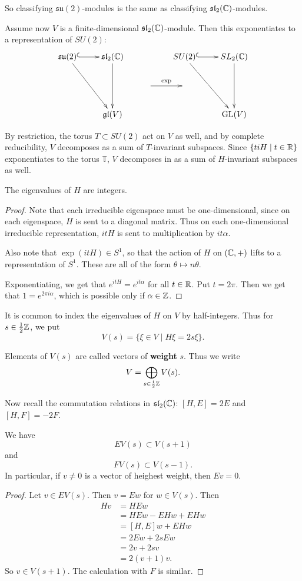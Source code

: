 \documentclass[11pt, english]{article}
\begin{document}
So classifying $\mathfrak{su}(2)$-modules is the same as classifying $\mathfrak{sl}_2(\mathbb{C})$-modules.

Assume now $V$ is a finite-dimensional $\mathfrak{sl}_2(\mathbb{C})$-module. Then this exponentiates to a representation of $SU(2)$:
$$
\xymatrix{
\mathfrak{su}(2) \ar@{^{(}->}[r] \ar[ddr] &  \mathfrak{sl}_2(\C) \ar[dd] & & SU(2) \ar[ddr]  \ar@{^(->}[r] & SL_2(\C) \ar[dd] \\
& & \ar[r]^{\exp}   & \\
&  \mathfrak{gl}(V) && & \GL(V)
}
$$

By restriction, the torus $T \subset SU(2)$ act on $V$ as well, and by complete reducibility, $V$ decomposes as a sum of $T$-invariant subspaces. Since $\{ ti H \mid t \in \mathbb{R} \}$ exponentiates to the torus $\mathbb T$, $V$ decomposes in as a sum of $H$-invariant subspaces as well.

\begin{lemma}
  The eigenvalues of $H$ are integers.
\end{lemma}
\begin{proof}
Note that each irreducible eigenspace must be one-dimensional, since on each eigenspace, $H$ is sent to a diagonal matrix. Thus on each one-dimensional irreducible representation, $itH$ is sent to multiplication by $it\alpha$.

Also note that $\exp(itH) \in S^1$, so that the action of $H$ on $(\mathbb{C},+)$ lifts to a representation of $S^1$. These are all of the form $\theta \mapsto n \theta$.

Exponentiating, we get that $e^{itH}=e^{it\alpha}$ for all $t \in \mathbb{R}$. Put $t=2\pi$. Then we get that $1=e^{2\pi i \alpha}$, which is possible only if $\alpha \in \mathbb{Z}$.
\end{proof}

It is common to index the eigenvalues of $H$ on $V$ by half-integers. Thus for $s \in \frac 12 \mathbb{Z}$, we put
$$
V(s) = \{ \xi \in V \mid H \xi = 2s \xi \}.
$$

Elements of $V(s)$ are called vectors of \textbf{weight} $s$. Thus we write
$$
V = \bigoplus_{s \in \frac 12 \mathbb{Z}} V(s).
$$

Now recall the commutation relations in $\mathfrak{sl}_2(\mathbb{C})$: $[H,E]=2E$ and $[H,F]=-2F$.

\begin{lemma}
  We have 
$$
EV(s) \subset V(s+1)
$$
and 
$$
FV(s) \subset V(s-1).
$$
In particular, if $v \neq 0$ is a vector of heighest weight, then $Ev = 0$.
\end{lemma}
\begin{proof}
Let $v \in EV(s)$. Then $v=Ew$ for $w \in V(s)$. Then
\begin{align*}
  Hv &= HEw \\
&= HEw - EHw + EHw \\
&= [H,E]w + EHw \\
&= 2Ew + 2sEw\\
&=2v+2sv \\
&=2(v+1)v.
\end{align*}
So $v \in V(s+1)$. The calculation with $F$ is similar.
\end{proof}
\end{document}
